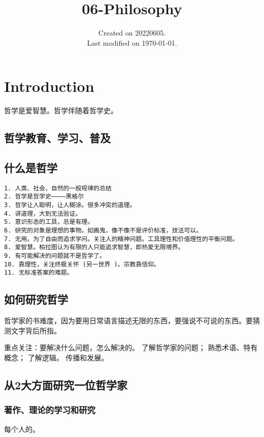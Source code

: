 \documentclass[UTF8]{../RepresentationUniverse}
\begin{document}
\title{06-Philosophy}
\date{Created on 20220605.\\   Last modified on \today.}
\maketitle
\tableofcontents


\chapter{Introduction}

哲学是爱智慧。哲学伴随着哲学史。

\section{哲学教育、学习、普及}


\section{什么是哲学}

\begin{lstlisting}
1. 人类、社会、自然的一般规律的总结
2. 哲学是哲学史————黑格尔
3. 哲学让人聪明，让人糊涂。很多冲突的道理。
4. 讲道理，大到无法验证。
5. 意识形态的工具，总是有理。
6. 研究的对象是理想的事物。如画鬼，像不像不是评价标准，技法可以。
7. 无用。为了自由而追求学问。关注人的精神问题。工具理性和价值理性的平衡问题。
8. 爱智慧。柏拉图认为有限的人只能追求智慧，即热爱无限境界。
9. 有可能解决的问题就不是哲学了。
10. 靠理性，关注终极关怀 (另一世界 )。宗教靠信仰。
11. 无标准答案的难题。
\end{lstlisting}


\section{如何研究哲学}

哲学家的书难度，因为要用日常语言描述无限的东西，要强说不可说的东西。要猜测文字背后所指。

重点关注：要解决什么问题，怎么解决的。
了解哲学家的问题；
熟悉术语、特有概念；
了解逻辑。
传播和发展。

\section{从2大方面研究一位哲学家}

\subsection{著作、理论的学习和研究}
每个人的。
\end{document}
